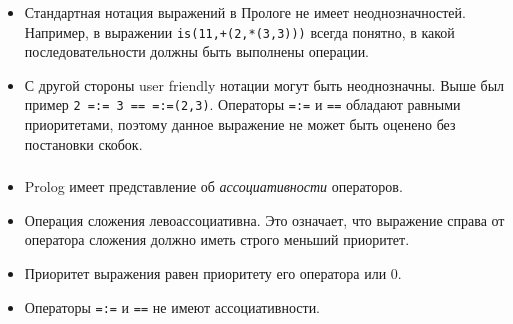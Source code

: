 \begin{frame}

	\frametitle{\insertsection}
	\framesubtitle{\insertsubsection}
	
	\begin{itemize}
		\item Стандартная нотация выражений в Прологе не имеет неоднозначностей. Например, в выражении \texttt{is(11,+(2,*(3,3)))} всегда понятно, в какой последовательности должны быть выполнены операции.
		\item С другой стороны user friendly нотации могут быть неоднозначны. Выше был пример \texttt{2 =:= 3 == =:=(2,3)}. Операторы \texttt{=:=} и \texttt{==} обладают равными приоритетами, поэтому данное выражение не может быть оценено без постановки скобок.
	\end{itemize}

\end{frame}




\begin{frame}

	\frametitle{\insertsection}
	\framesubtitle{\insertsubsection}
	
	\begin{itemize}
		\item Prolog имеет представление об \textit{ассоциативности} операторов.
		\item Операция сложения левоассоциативна. Это означает, что выражение справа от оператора сложения должно иметь строго меньший приоритет.
		\item Приоритет выражения равен приоритету его оператора или 0.
		\item Операторы \texttt{=:=} и \texttt{==} не имеют ассоциативности.
	\end{itemize}

\end{frame}


